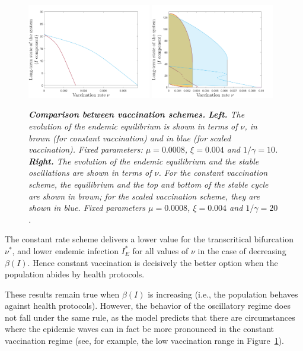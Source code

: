 \documentclass[10pt]{article}
\begin{document}
\begin{figure}[h!]
\begin{center}
\includegraphics[width=0.48\textwidth]{figures/scheme_comparison_beta_decreasing_gamma_10.png}
\includegraphics[width=0.48\textwidth]{figures/scheme_comparison_beta_increasing_gamma_20.png}
\end{center}
\caption{\emph{{\bf Comparison between vaccination schemes.} {\bf Left.} The evolution of the endemic equilibrium is shown in terms of $\nu$, in brown (for constant vaccination) and in blue (for scaled vaccination). Fixed parameters: $\mu = 0.0008$, $\xi=0.004$ and $1/\gamma=10$. {\bf Right.} The evolution of the endemic equilibrium and the stable oscillations are shown in terms of $\nu$. For the constant vaccination scheme, the equilibrium and the top and bottom of the stable cycle are shown in brown; for the scaled vaccination scheme, they are shown in blue. Fixed parameters $\mu = 0.0008$, $\xi=0.004$ and $1/\gamma=20$. }}
\label{comparison_schemes}
\end{figure}

The constant rate scheme delivers a lower value for the transcritical bifurcation $\nu^*$, and lower endemic infection $I_E^*$ for all values of $\nu$ in the case of decreasing $\beta(I)$. Hence constant vaccination is decisively the better option when the population abides by health protocols.

These results remain true when $\beta(I)$ is increasing (i.e., the population behaves against health protocols). However, the behavior of the oscillatory regime does not fall under the same rule, as the model predicts that there are circumstances where the epidemic waves can in fact be more pronounced in the constant vaccination regime (see, for example, the low vaccination range in Figure~\ref{comparison_schemes}).
\end{document}
